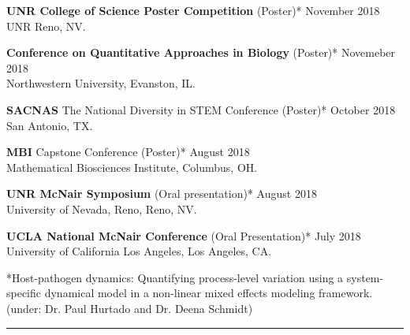 \documentclass{article}
\begin{document}


\begin{description}
	\vspace{-2mm}
	\item[Conference Presentations and Posters]\hspace*{.1in} 
		
		\textbf{UNR College of Science Poster Competition} (Poster)* \hfill{November 2018} \\
		UNR Reno, NV.
		\vspace*{1mm}
		
		\textbf{Conference on Quantitative Approaches in Biology} (Poster)* \hfill{Novemeber 2018} \\
		Northwestern University, Evanston, IL.
		\vspace*{1mm}
		
		\textbf{SACNAS} The National Diversity in STEM Conference (Poster)* \hfill{October 2018} \\
		San Antonio, TX.
		\vspace*{1mm}
		
		\textbf{MBI} Capstone Conference (Poster)* \hfill{August 2018} \\
		Mathematical Biosciences Institute, Columbus, OH.
		\vspace*{1mm}
		
		\textbf{UNR McNair Symposium} (Oral presentation)* \hfill{August 2018} \\ 
		University of Nevada, Reno, Reno, NV.
		\vspace*{1mm}
		
		\textbf{UCLA National McNair Conference} (Oral Presentation)* \hfill{July 2018}\\
		University of California Los Angeles, Los Angeles, CA.
		\vspace*{1mm}
		
		*Host-pathogen dynamics: Quantifying process-level variation using a system-specific dynamical model in a non-linear mixed effects modeling framework. (under: Dr. Paul Hurtado and Dr. Deena Schmidt)
	
\end{description}
\vspace{-2mm}
\rule{\linewidth}{1pt}
\end{document}
